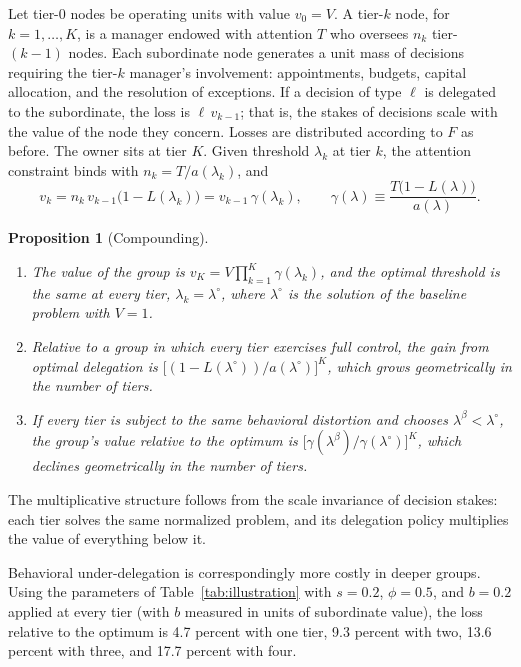 \documentclass[11pt,a4paper]{article}
\theoremstyle{plain}
\newtheorem{proposition}{Proposition}
\begin{document}
Let tier-0 nodes be operating units with value $v_0 = V$. A tier-$k$ node, for $k = 1, \dots, K$, is a manager endowed with attention $T$ who oversees $n_k$ tier-$(k-1)$ nodes. Each subordinate node generates a unit mass of decisions requiring the tier-$k$ manager's involvement: appointments, budgets, capital allocation, and the resolution of exceptions. If a decision of type $\ell$ is delegated to the subordinate, the loss is $\ell \, v_{k-1}$; that is, the stakes of decisions scale with the value of the node they concern. Losses are distributed according to $F$ as before. The owner sits at tier $K$. Given threshold $\lambda_k$ at tier $k$, the attention constraint binds with $n_k = T / a(\lambda_k)$, and
\begin{equation}\label{eq:recursion}
  v_k = n_k \, v_{k-1} \big(1 - L(\lambda_k)\big) = v_{k-1} \, \gamma(\lambda_k), \qquad \gamma(\lambda) \equiv \frac{T \big(1 - L(\lambda)\big)}{a(\lambda)}.
\end{equation}

\begin{proposition}[Compounding]\label{prop:compounding}
\leavevmode
\begin{enumerate}
  \item The value of the group is $v_K = V \prod_{k=1}^K \gamma(\lambda_k)$, and the optimal threshold is the same at every tier, $\lambda_k = \lambda^\circ$, where $\lambda^\circ$ is the solution of the baseline problem with $V = 1$.
  \item Relative to a group in which every tier exercises full control, the gain from optimal delegation is $\big[(1 - L(\lambda^\circ)) / a(\lambda^\circ)\big]^K$, which grows geometrically in the number of tiers.
  \item If every tier is subject to the same behavioral distortion and chooses $\lambda^\beta < \lambda^\circ$, the group's value relative to the optimum is $\big[\gamma(\lambda^\beta) / \gamma(\lambda^\circ)\big]^K$, which declines geometrically in the number of tiers.
\end{enumerate}
\end{proposition}

The multiplicative structure follows from the scale invariance of decision stakes: each tier solves the same normalized problem, and its delegation policy multiplies the value of everything below it.

Behavioral under-delegation is correspondingly more costly in deeper groups. Using the parameters of Table~\ref{tab:illustration} with $s = 0.2$, $\phi = 0.5$, and $b = 0.2$ applied at every tier (with $b$ measured in units of subordinate value), the loss relative to the optimum is 4.7 percent with one tier, 9.3 percent with two, 13.6 percent with three, and 17.7 percent with four.
\end{document}
